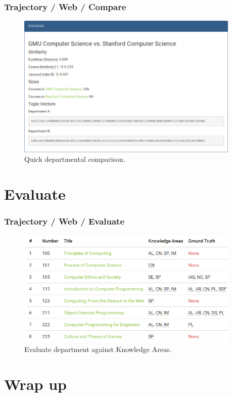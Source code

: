 \documentclass[10pt, compress]{beamer}
\begin{document}
\begin{frame}
  \frametitle{Trajectory / Web / Compare}
  \begin{figure}
    \centering
    \includegraphics[width=0.95\textwidth]{figs/shots/stats.png}
    \caption{Quick departmental comparison.}
  \end{figure}
\end{frame}

\section{Evaluate}

\begin{frame}
  \frametitle{Trajectory / Web / Evaluate}
  \begin{figure}
    \centering
    \includegraphics[width=0.95\textwidth]{figs/shots/evaluation.png}
    \caption{Evaluate department against Knowledge Areas.}
  \end{figure}
\end{frame}


\section{Wrap up}
\end{document}
